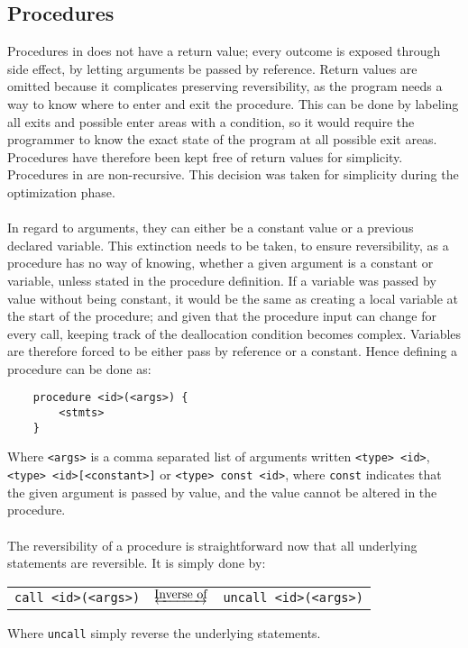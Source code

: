 \subsection{Procedures \rr}
Procedures in \lan does not have a return value; every outcome is exposed through side
effect, by letting arguments be passed by reference. Return values are omitted because it
complicates preserving reversibility, as the program needs a way to know where to enter and exit
the procedure. This can be done by labeling all exits and possible enter areas with a condition,
so it would require the programmer to know the exact state of the program at all possible exit areas.
Procedures have therefore been kept free of return values for simplicity. Procedures in \lan are
non-recursive. This decision was taken for simplicity during the optimization phase.
\\
\\
In regard to arguments, they can either be a constant value or a previous declared variable. This
extinction needs to be taken, to ensure reversibility, as a procedure has no way of knowing, whether
a given argument is a constant or variable, unless stated in the procedure definition. If a variable
was passed by value without being constant, it would be the same as creating a local variable at
the start of the procedure; and given that the procedure input can change for every call, keeping
track of the deallocation condition becomes complex. Variables are therefore forced to be either
pass by reference or a constant. Hence defining a procedure can be done as:

\begin{lstlisting}
    procedure <id>(<args>) {
        <stmts>
    }
\end{lstlisting}
\noindent
Where \texttt{<args>} is a comma separated list of arguments written \texttt{<type> <id>},
\texttt{<type> <id>[<constant>]} or
\texttt{<type> const <id>}, where \texttt{const} indicates that the given argument is passed by
value, and the value cannot be altered in the procedure.
\\
\\
The reversibility of a procedure is straightforward now that all underlying statements are
reversible. It is simply done by:

\begin{table*}[!h]
    \centering
    \begin{tabular}{lcl}
        \texttt{call <id>(<args>)} & $\underleftrightarrow{\text{Inverse of}}$ & \texttt{uncall <id>(<args>)}
    \end{tabular}
\end{table*}
\noindent
Where \texttt{uncall} simply reverse the underlying statements.

